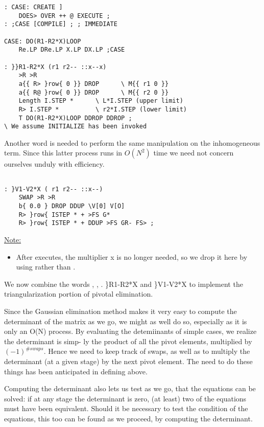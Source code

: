 \begin{verbatim}
: CASE: CREATE ]
    DOES> OVER ++ @ EXECUTE ;
: ;CASE [COMPILE] ; ; IMMEDIATE

CASE: DO(R1-R2*X)LOOP
    Re.LP DRe.LP X.LP DX.LP ;CASE

: }}R1-R2*X (r1 r2-- ::x--x)
    >R >R
    a{{ R> }row{ 0 }} DROP      \ M{{ r1 0 }} 
    a{{ R@ }row{ 0 }} DROP      \ M{{ r2 0 }} 
    Length I.STEP *      \ L*I.STEP (upper limit)
    R> I.STEP *          \ r2*I.STEP (lower limit)
    T DO(R1-R2*X)LOOP DDROP DDROP ;
\ We assume INITIALIZE has been invoked
\end{verbatim} 
Another word is needed to perform the same manipulation on
the inhomogeneous term. Since this latter process runs in $O(N^2)$
time we need not concern ourselves unduly with efficiency.
\begin{verbatim}

: }V1-V2*X ( r1 r2-- ::x--)
    SWAP >R >R
    b{ 0.0 } DROP DDUP \V[0] V[O]
    R> }row{ ISTEP * + >FS G*
    R> }row{ ISTEP * + DDUP >FS GR- FS> ;
\end{verbatim} 

\underline{Note:}
\begin{itemize}
    \item  After  executes, the multiplier x is no longer needed,
        so we drop it here by using  rather than .
\end{itemize}

We now combine the words , , .
\}R1-R2*X and \}V1-V2*X to implement the triangularization portion of pivotal elimination.

Since the Gaussian elimination method makes it very easy to
compute the determinant of the matrix as we go, we might as well
do so, especially as it is only an O(N) process. By evaluating the
detemiinants of simple cases, we realize the determinant is simp-
ly the product of all the pivot elements, multiplied by
$(-1)^{\#swaps}$. Hence we need to keep track of swaps, as well as to
multiply the determinant (at a given stage) by the next pivot
element. The need to do these things has been anticipated in
defining  above.

Computing the determinant also lets us test as we go, that the
equations can be solved: if at any stage the determinant is zero,
(at least) two of the equations must have been equivalent. Should
it be necessary to test the condition of the equations, this too
can be found as we proceed, by computing the determinant.


